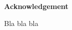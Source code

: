 \justifying
\vspace*{4\baselineskip}
{\LARGE\bfseries 
	Acknowledgement\\
} 

\vspace*{1\baselineskip}

Bla bla bla

